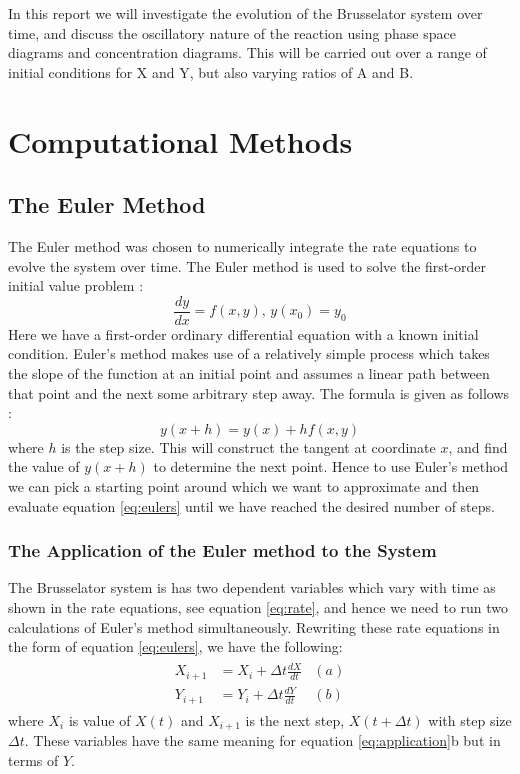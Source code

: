 \documentclass[reprint, amsmath, amssymb, aps]{revtex4-2}
\begin{document}
In this report we will investigate the evolution of the Brusselator system over time, and discuss the oscillatory nature of the reaction using phase space diagrams and concentration diagrams. This will be carried out over a range of initial conditions for X and Y, but also varying ratios of A and B.

\section{Computational Methods}

\subsection{The Euler Method}
The Euler method was chosen to numerically integrate the rate equations to evolve the system over time. The Euler method is used to solve the first-order initial value problem \cite{eulerError}:
\begin{equation}
	\frac{dy}{dx} = f\left(x, y \right),\, y(x_0) = y_0
\end{equation}Here we have a first-order ordinary differential equation with a known initial condition. Euler's method makes use of a relatively simple process which takes the slope of the function at an initial point and assumes a linear path between that point and the next some arbitrary step away. The formula is given as follows \cite{paulsNotes}:
\begin{equation}
	y(x+h) = y(x) + h f(x, y)
	\label{eq:eulers}
\end{equation}where $h$ is the step size. This will construct the tangent at coordinate $x$, and find the value of $y(x+h)$ to determine the next point. Hence to use Euler's method we can pick a starting point around which we want to approximate and then evaluate equation \ref{eq:eulers} until we have reached the desired number of steps.

\subsubsection{The Application of the Euler method to the System}

The Brusselator system is has two dependent variables which vary with time as shown in the rate equations, see equation \ref{eq:rate}, and hence we need to run two calculations of Euler's method simultaneously. Rewriting these rate equations in the form of equation \ref{eq:eulers}, we have the following:
\begin{align}
	\begin{aligned}
	X_{i+1} &= X_i + \Delta t \frac{dX}{dt} & (a)\\
	Y_{i+1} &= Y_i + \Delta t \frac{dY}{dt} & (b)
	\end{aligned}
	\label{eq:application}
\end{align}where $X_{i}$ is value of $X(t)$ and $X_{i+1}$ is the next step, $X(t+\Delta t)$ with step size $\Delta t$. These variables have the same meaning for equation \ref{eq:application}b but in terms of $Y$.
\end{document}
